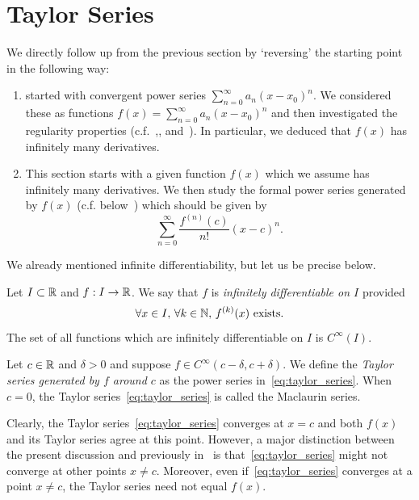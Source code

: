 \section{Taylor Series}
\label{sec:taylor}
We directly follow up from the previous section by `reversing' the starting point in the following way:
\begin{enumerate}
	\item {} started with convergent power series $\sum_{n=0}^\infty a_n(x-x_0)^n$. We considered these as functions $f(x) = \sum_{n=0}^\infty a_n(x-x_0)^n$ and then investigated the regularity properties (c.f.~,, and~). In particular, we deduced that $f(x)$ has infinitely many derivatives.
	\item This section starts with a given function $f(x)$ which we assume has infinitely many derivatives. We then study the formal power series generated by $f(x)$ (c.f. below~) which should be given by
	\begin{equation}
		\label{eq:taylor_series}
		\sum_{n=0}^\infty \frac{f^{(n)}(c)}{n!}(x-c)^n.
	\end{equation}
\end{enumerate}
We already mentioned infinite differentiability, but let us be precise below.
\begin{defn}
	\label{defn:inf_diff_taylor}
	Let $I\subset \mathbb{R}$ and $f:I\to \mathbb{R}$. We say that $f$ is \textit{infinitely differentiable on $I$} provided
	\[
	\forall x\in I,\,\forall k\in \mathbb{N},\, f^{(k)}(x)\text{ exists.}
	\]
	The set of all functions which are infinitely differentiable on $I$ is $C^\infty(I)$.
	
	Let $c\in\mathbb{R}$ and $\delta>0$ and suppose $f\in C^\infty(c-\delta,c+\delta)$. We define the \textit{Taylor series generated by $f$ around $c$} as the power series in~\eqref{eq:taylor_series}. When $c=0$, the Taylor series~\eqref{eq:taylor_series} is called the Maclaurin series.
\end{defn}
Clearly, the Taylor series~\eqref{eq:taylor_series} converges at $x=c$ and both $f(x)$ and its Taylor series agree at this point. However, a major distinction between the present discussion and previously in~ is that~\eqref{eq:taylor_series} might not converge at other points $x\neq c$. Moreover, even if~\eqref{eq:taylor_series} converges at a point $x\neq c$, the Taylor series need not equal $f(x)$.
